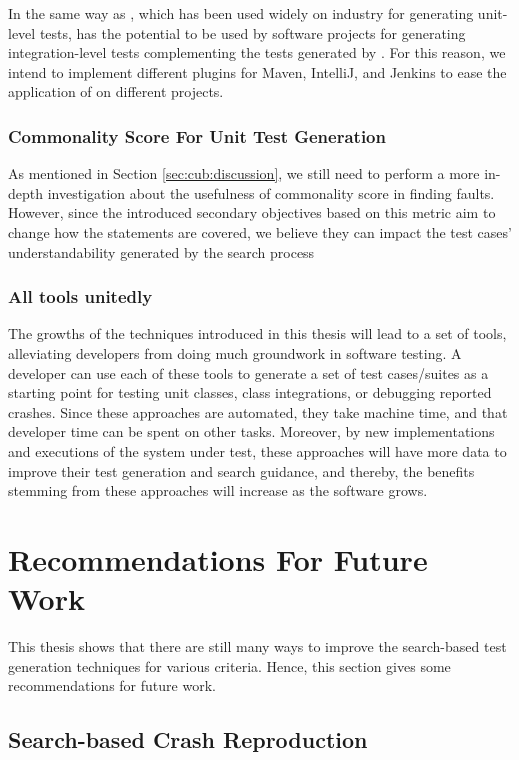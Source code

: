 In the same way as \evosuite, which has been used widely on industry \cite{almasi2017industrial} for generating unit-level tests, \cling has the potential to be used by software projects for generating integration-level tests complementing the tests generated by \evosuite. For this reason, we intend to implement different plugins for Maven, IntelliJ, and Jenkins to ease the application of \cling on different projects.

\subsubsection{Commonality Score For Unit Test Generation}
As mentioned in Section \ref{sec:cub:discussion}, we still need to perform a more in-depth investigation about the usefulness of commonality score in finding faults. However, since the introduced secondary objectives based on this metric aim to change how the statements are covered, we believe they can impact the test cases' understandability generated by the search process


\subsubsection{All tools unitedly}
The growths of the techniques introduced in this thesis will lead to a set of tools, alleviating developers from doing much groundwork in software testing. A developer can use each of these tools to generate a set of test cases/suites as a starting point for testing unit classes, class integrations, or debugging reported crashes. Since these approaches are automated, they take machine time, and that developer time can be spent on other tasks.  
Moreover, by new implementations and executions of the system under test, these approaches will have more data to improve their test generation and search guidance, and thereby, the benefits stemming from these approaches will increase as the software grows.

\section{Recommendations For Future Work}
This thesis shows that there are still many ways to improve the search-based test generation techniques for various criteria. Hence, this section gives some recommendations for future work.
\subsection{Search-based Crash Reproduction}

